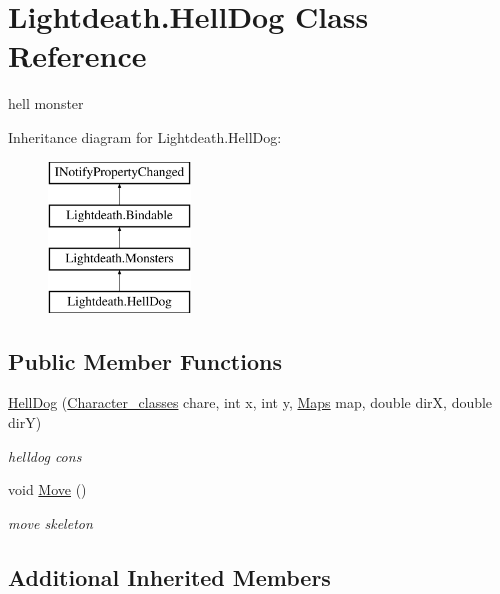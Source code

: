 \hypertarget{class_lightdeath_1_1_hell_dog}{}\section{Lightdeath.\+Hell\+Dog Class Reference}
\label{class_lightdeath_1_1_hell_dog}


hell monster  


Inheritance diagram for Lightdeath.\+Hell\+Dog\+:\begin{figure}[H]
\begin{center}
\leavevmode
\includegraphics[height=4.000000cm]{class_lightdeath_1_1_hell_dog}
\end{center}
\end{figure}
\subsection*{Public Member Functions}
\begin{DoxyCompactItemize}
\item 
\hyperlink{class_lightdeath_1_1_hell_dog_a22a3d87dec75cfd631b290f989377155}{Hell\+Dog} (\hyperlink{class_lightdeath_1_1_character__classes}{Character\+\_\+classes} chare, int x, int y, \hyperlink{class_lightdeath_1_1_maps}{Maps} map, double dirX, double dirY)
\begin{DoxyCompactList}\small\item\em helldog cons \end{DoxyCompactList}\item 
void \hyperlink{class_lightdeath_1_1_hell_dog_a52224ca405d71fcc04cd9d55da61b3a3}{Move} ()
\begin{DoxyCompactList}\small\item\em move skeleton \end{DoxyCompactList}\end{DoxyCompactItemize}
\subsection*{Additional Inherited Members}



